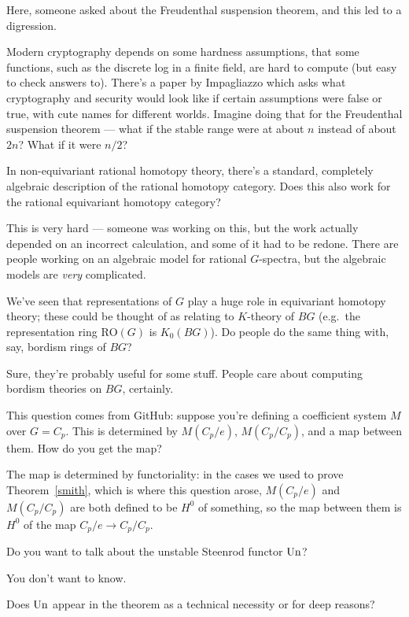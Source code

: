 Here, someone asked about the Freudenthal suspension theorem, and this led to a digression.
\begin{rem}
Modern cryptography depends on some hardness assumptions, that some functions, such as the discrete log in a finite
field, are hard to compute (but easy to check answers to). There's a paper by Impagliazzo which asks what
cryptography and security would look like if certain assumptions were false or true, with cute names for different
worlds. Imagine doing that for the Freudenthal suspension theorem --- what if the stable range were at about $n$
instead of about $2n$? What if it were $n/2$?
\end{rem}
\begin{ques}
In non-equivariant rational homotopy theory, there's a standard, completely algebraic description of the rational
homotopy category. Does this also work for the rational equivariant homotopy category?
\end{ques}
This is very hard --- someone was working on this, but the work actually depended on an incorrect calculation, and
some of it had to be redone. There are people working on an algebraic model for rational $G$-spectra, but the
algebraic models are \emph{very} complicated.
\begin{ques}
We've seen that representations of $G$ play a huge role in equivariant homotopy theory; these could be thought of
as relating to $K$-theory of $BG$ (e.g.\ the representation ring $\mathrm{RO}(G)$ is $K_0(BG)$). Do people do the
same thing with, say, bordism rings of $BG$? %
\end{ques}
Sure, they're probably useful for some stuff. People care about computing bordism theories on $BG$, certainly.
\begin{ques}
This question comes from GitHub: suppose you're defining a coefficient system $M$ over $G = C_p$. This is
determined by $M(C_p/e)$, $M(C_p/C_p)$, and a map between them. How do you get the map?
\end{ques}
The map is determined by functoriality: in the cases we used to prove Theorem~\ref{smith}, which is where this
question arose, $M(C_p/e)$ and $M(C_p/C_p)$ are both defined to be $H^0$ of something, so the map between them is
$H^0$ of the map $C_p/e\to C_p/C_p$.
\begin{ques}
Do you want to talk about the unstable Steenrod functor $\operatorname{Un}$?
\end{ques}
You don't want to know.
\begin{ques}
Does $\operatorname{Un}$ appear in the theorem as a technical necessity or for deep reasons?
\end{ques}

